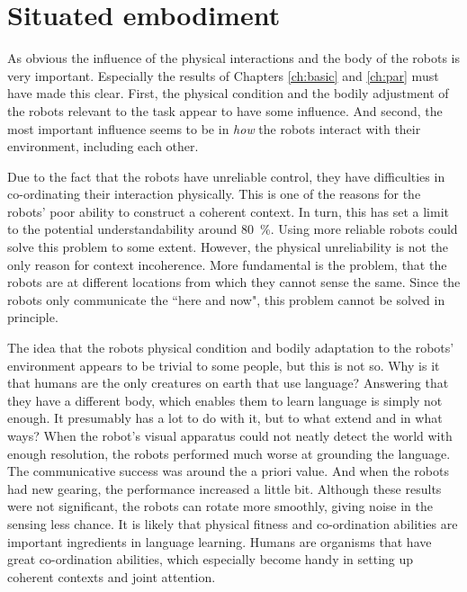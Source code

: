 \section{Situated embodiment}\label{s:disc:phys}

As obvious the influence of the physical interactions and the body of the robots is very important. Especially the results of Chapters \ref{ch:basic} and \ref{ch:par} must have made this clear. First, the physical condition and the bodily adjustment of the robots relevant to the task appear to have some influence. And second, the most important influence seems to be in {\em how} the robots interact with their environment, including each other.

Due to the fact that the robots have unreliable control, they have difficulties in co-ordinating their interaction physically. This is one of the reasons for the robots' poor ability to construct a coherent context. In turn, this has set a limit to the potential understandability around 80~\%. Using more reliable robots could solve this problem to some extent. However, the physical unreliability is not the only reason for context incoherence. More fundamental is the problem, that the robots are at different locations from which they cannot sense the same. Since the robots only communicate the ``here and now", this problem cannot be solved in principle.

The idea that the robots physical condition and bodily adaptation to the robots' environment appears to be trivial to some people, but this is not so. Why is it that humans are the only creatures on earth that use language? Answering that they have a different body, which enables them to learn language is simply not enough. It presumably has a lot to do with it, but to what extend and in what ways? When the robot's visual apparatus could not neatly detect the world with enough resolution, the robots performed much worse at grounding the language. The communicative success was around the a priori value. And when the robots had new gearing, the performance increased a little bit. Although these results were not significant, the robots can rotate more smoothly, giving noise in the sensing less chance. It is likely that physical fitness and co-ordination abilities are important ingredients in language learning. Humans are organisms that have great co-ordination abilities, which especially become handy in setting up coherent contexts and joint attention.

